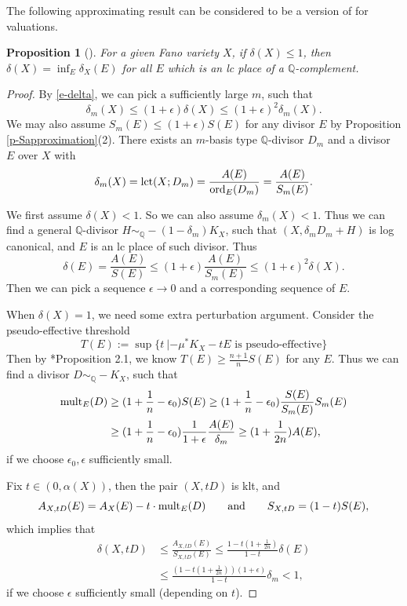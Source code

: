 \documentclass[12pt,reqno]{amsart}%
\newcommand{\mult}{{\rm mult}}
\newcommand{\ord}{{\rm ord}}
\newtheorem{prop}[thm]{Proposition}
\theoremstyle{definition}
\theoremstyle{remark}
\newcommand{\lct}{{\rm lct}}
\newcommand{\bQ}{{\mathbb{Q}}}
\begin{document}
The following approximating result can be considered to be a version of \cite{LX14} for valuations. 
\begin{prop}[{\cite{BLX19, BLZ19}}]\label{p-deltaapproximation}
For a given Fano variety $X$, if $\delta(X)\le 1$, then $\delta(X)=\inf_E \delta_X(E)$ for all $E$ which is an lc place of a $\bQ$-complement.
\end{prop}



\begin{proof}  By \eqref{e-delta}, we can pick a sufficiently large $m$, such that
$$\delta_m(X)\le (1+\epsilon)\delta(X)\le (1+\epsilon)^2\delta_m(X).$$  
We may also assume $S_m(E)\le (1+\epsilon) S(E)$ for any divisor $E$ by Proposition \ref{p-Sapproximation}(2). There exists  an $m$-basis type $\bQ$-divisor $D_m$ and a divisor $E$ over $X$ with
$$\delta_m(X)=\lct(X; D_m)=\frac{A(E)}{\ord_E(D_m)}=\frac{A(E)}{S_m(E)}.$$

We first assume $\delta(X)<1$. So we can also assume $\delta_m(X)<1$. Thus we can find a general $\bQ$-divisor $H\sim_{\bQ} -(1-\delta_m)K_X$, such that $(X, \delta_m D_m+H)$ is log canonical, and $E$ is an lc place of such divisor. Thus
$$\delta(E)=\frac{A(E)}{S(E)}\le (1+\epsilon)\frac{A(E)}{S_m(E)}\le (1+\epsilon)^2\delta(X).$$
Then we can pick a sequence $\epsilon\to 0$ and a corresponding sequence of $E$. 

\medskip

When $\delta(X)=1$, we need some extra perturbation argument. Consider the pseudo-effective threshold 
\[
\mbox{$T(E):=\sup\{ t\ |-\mu^*K_X-tE \mbox{ is pseudo-effective} \}$}
\]
Then by \cite{Fuj19c}*{Proposition 2.1}, we know 
$T(E)\ge \frac{n+1}{n}S(E)$ for any $E$. Thus we can find a divisor $D\sim_{\mathbb{Q}} -K_X$, such that 
\begin{equation*}
\begin{split}
\mult_E(D)&\ge(1+\frac{1}{n}-\epsilon_0)S(E)\ge (1+\frac{1}{n}-\epsilon_0)\frac{S(E)}{S_m(E)}S_m(E) \\ 
&\ge (1+\frac{1}{n}-\epsilon_0)\frac{1}{1+\epsilon}\frac{A(E)}{\delta_m} \ge (1+\frac{1}{2n})A(E),
\end{split}
\end{equation*}
if we choose $\epsilon_0, \epsilon$ sufficiently small.

Fix $t\in (0, \alpha(X))$, then the pair $(X,t D)$ is klt, and 
$$A_{X,t D}(E)=A_X(E)-t\cdot  \mult_E(D)  \qquad \mbox{and} \qquad  S_{X,tD}=(1-t)S(E),$$
which implies that
\begin{equation*}
\begin{split}
\delta(X,t D)&\le\frac{A_{X,t D}(E)}{S_{X,t D}(E)}\le  \frac{1-t(1+\frac{1}{2n})}{1-t}\delta(E) \\
&\le\frac{(1-t(1+\frac{1}{2n}))(1+\epsilon)}{1-t} \delta_m<1,
\end{split}
\end{equation*}
if we choose $\epsilon$ sufficiently small (depending on $t$).


\end{proof}
\end{document}
